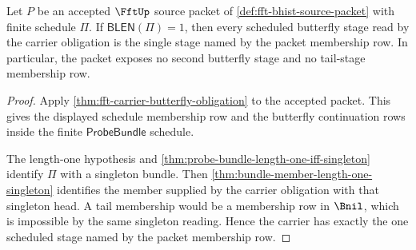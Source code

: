 \begin{lemma}
\label{lem:fft-length-one-schedule-stage-exhaustion}
Let $P$ be an accepted $\FftUp$ source packet of \autoref{def:fft-bhist-source-packet} with finite schedule $\Pi$. If $\mathsf{BLEN}(\Pi)=1$, then every scheduled butterfly stage read by the carrier obligation is the single stage named by the packet membership row. In particular, the packet exposes no second butterfly stage and no tail-stage membership row.
\end{lemma}
\begin{proof}
Apply \autoref{thm:fft-carrier-butterfly-obligation} to the accepted packet. This gives the displayed schedule membership row and the butterfly continuation rows inside the finite $\mathsf{ProbeBundle}$ schedule.

The length-one hypothesis and \autoref{thm:probe-bundle-length-one-iff-singleton} identify $\Pi$ with a singleton bundle. Then \autoref{thm:bundle-member-length-one-singleton} identifies the member supplied by the carrier obligation with that singleton head. A tail membership would be a membership row in $\Bnil$, which is impossible by the same singleton reading. Hence the carrier has exactly the one scheduled stage named by the packet membership row.
\end{proof}

